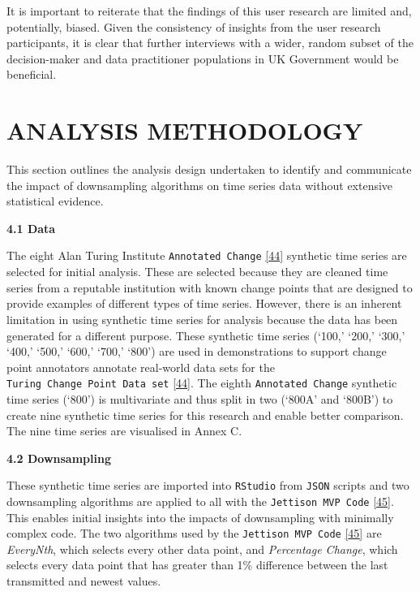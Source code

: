 \documentclass{article}
\begin{document}
It is important to reiterate that the findings of this user research are
limited and, potentially, biased. Given the consistency of insights from
the user research participants, it is clear that further interviews with
a wider, random subset of the decision-maker and data practitioner
populations in UK Government would be beneficial.

\hypertarget{analysis-methodology}{%
\section{ANALYSIS METHODOLOGY}\label{analysis-methodology}}

This section outlines the analysis design undertaken to identify and
communicate the impact of downsampling algorithms on time series data
without extensive statistical evidence.

\textbf{4.1 Data}

The eight Alan Turing Institute \texttt{Annotated\ Change}
\protect\hyperlink{ref-ATIChangePoint}{{[}44{]}} synthetic time series
are selected for initial analysis. These are selected because they are
cleaned time series from a reputable institution with known change
points that are designed to provide examples of different types of time
series. However, there is an inherent limitation in using synthetic time
series for analysis because the data has been generated for a different
purpose. These synthetic time series (`100,' `200,' `300,' `400,' `500,'
`600,' `700,' `800') are used in demonstrations to support change point
annotators annotate real-world data sets for the
\texttt{Turing\ Change\ Point\ Data\ set}
\protect\hyperlink{ref-ATIChangePoint}{{[}44{]}}. The eighth
\texttt{Annotated\ Change} synthetic time series (`800') is multivariate
and thus split in two (`800A' and `800B') to create nine synthetic time
series for this research and enable better comparison. The nine time
series are visualised in Annex C.

\textbf{4.2 Downsampling}

These synthetic time series are imported into \texttt{RStudio} from
\texttt{JSON} scripts and two downsampling algorithms are applied to all
with the \texttt{Jettison\ MVP\ Code}
\protect\hyperlink{ref-Jettison}{{[}45{]}}. This enables initial
insights into the impacts of downsampling with minimally complex code.
The two algorithms used by the \texttt{Jettison\ MVP\ Code}
\protect\hyperlink{ref-Jettison}{{[}45{]}} are \emph{EveryNth}, which
selects every other data point, and \emph{Percentage Change}, which
selects every data point that has greater than 1\% difference between
the last transmitted and newest values.
\end{document}

